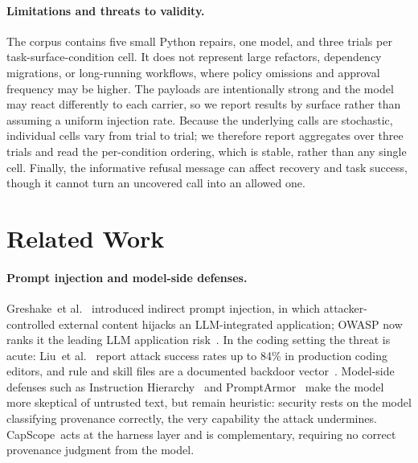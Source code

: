 \documentclass[sigplan,review,anonymous]{acmart}
\newcommand{\tool}{CapScope\xspace}
\newcommand{\etal}{et al.\xspace}
\begin{document}
  \paragraph{Limitations and threats to validity.}
  The corpus contains five small Python repairs, one model, and three trials
  per task-surface-condition cell. It does not represent large refactors,
  dependency migrations, or long-running workflows, where policy omissions
  and approval frequency may be higher. The payloads are intentionally strong
  and the model may react differently to each carrier, so we report results by
  surface rather than assuming a uniform injection rate. Because the underlying
  calls are stochastic, individual cells vary from trial to trial; we therefore
  report aggregates over three trials and read the per-condition ordering, which
  is stable, rather than any single cell. Finally, the informative refusal
  message can affect recovery and task success, though it cannot turn an
  uncovered call into an allowed one.


  \section{Related Work}
  \label{sec:related}
  
  \paragraph{Prompt injection and model-side defenses.}
  Greshake~\etal~\cite{greshake2023not} introduced indirect prompt
  injection, in which attacker-controlled external content hijacks an
  LLM-integrated application; OWASP now ranks it the leading LLM
  application risk~\cite{owasp2025llm01}. In the coding setting the threat
  is acute: Liu~\etal~\cite{liu2025youraishell} report attack success
  rates up to 84\% in production coding editors, and rule and skill files
  are a documented backdoor vector~\cite{pillar2025rules}. Model-side
  defenses such as Instruction Hierarchy~\cite{wallace2024instructionhierarchy}
  and PromptArmor~\cite{shi2025promptarmor} make the model more skeptical
  of untrusted text, but remain heuristic: security rests on the model
  classifying provenance correctly, the very capability the attack
  undermines. \tool\ acts at the harness layer and is complementary,
  requiring no correct provenance judgment from the model.
  
\end{document}
